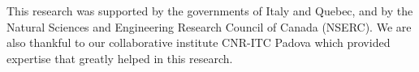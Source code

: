 \documentclass[]{spie}  %
\begin{document}






\newpage

\acknowledgments %
 
This research was supported by the governments of Italy and Quebec, and by the Natural
Sciences and Engineering Research Council of Canada (NSERC). We are also thankful to
our collaborative institute CNR-ITC Padova which provided expertise that greatly helped
in this research. 

\end{document}
